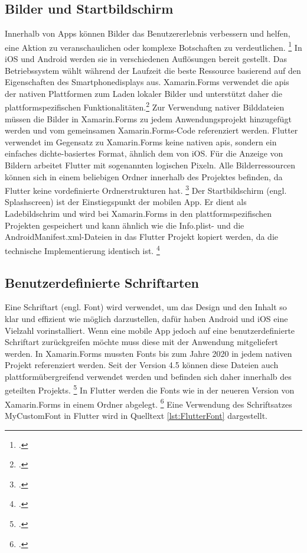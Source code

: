 \subsection{Bilder und Startbildschirm}
Innerhalb von Apps können Bilder das Benutzererlebnis verbessern und helfen,  eine Aktion zu veranschaulichen oder komplexe Botschaften zu verdeutlichen.  \footcite[Vgl.][Abgerufen am \today]{GoogleMaterialImages2020} In iOS und Android werden sie in verschiedenen Auflösungen bereit gestellt.  Das Betriebssystem wählt während der Laufzeit die beste Ressource basierend auf den Eigenschaften des Smartphonedisplays aus.  Xamarin.Forms verwendet die \acfp{api} der nativen Plattformen zum Laden lokaler Bilder und unterstützt daher die plattformspezifischen Funktionalitäten.\footcite[Vgl.][Abgerufen am \today]{MicrosoftXamImages2020} Zur Verwendung nativer Bilddateien müssen die Bilder in Xamarin.Forms zu jedem Anwendungsprojekt hinzugefügt werden und vom gemeinsamen Xamarin.Forms-Code referenziert werden.  Flutter verwendet im Gegensatz zu Xamarin.Forms keine nativen \acp{api},  sondern ein einfaches dichte-basiertes Format,  ähnlich dem von iOS.  Für die Anzeige von Bildern arbeitet Flutter mit sogenannten logischen Pixeln.  Alle Bilderressourcen können sich in einem beliebigen Ordner innerhalb des Projektes befinden, da Flutter keine vordefinierte Ordnerstrukturen hat. \footcite[Vgl.][Abgerufen am \today]{GoogleFlutterImages2020} Der Startbildschirm (engl. Splashscreen) ist der Einstiegspunkt der mobilen App.  Er dient als Ladebildschrim und wird bei Xamarin.Forms in den plattformspezifischen Projekten gespeichert und kann ähnlich wie die \glq Info.plist\grq{}- und die \glq AndroidManifest.xml\grq{}-Dateien in das Flutter Projekt kopiert werden,  da die technische Implementierung identisch ist. \footcite[Vgl.][Abgerufen am \today]{GoogleSplash2020} 


\subsection{Benutzerdefinierte Schriftarten}
Eine Schriftart (engl. Font) wird verwendet,  um das Design und den Inhalt so klar und effizient wie möglich darzustellen,  dafür haben Android und iOS  eine Vielzahl vorinstalliert.  Wenn eine mobile App jedoch auf eine benutzerdefinierte Schriftart zurückgreifen möchte muss diese mit der Anwendung mitgeliefert werden.  In Xamarin.Forms mussten Fonts bis zum Jahre 2020 in jedem nativen Projekt referenziert werden.  Seit der Version 4.5 können diese Dateien auch plattformübergreifend verwendet werden und befinden sich daher innerhalb des geteilten Projekts. \footcite[Vgl.][Abgerufen am \today]{Versluis2020}  In Flutter werden die Fonts wie in der neueren Version von Xamarin.Forms in einem Ordner abgelegt. \footcite[Vgl.][Abgerufen am \today]{GoogleFlutterFonts2020}  Eine Verwendung des Schriftsatzes \glq MyCustomFont\grq{} in Flutter wird in Quelltext \ref{lst:FlutterFont} dargestellt.  

